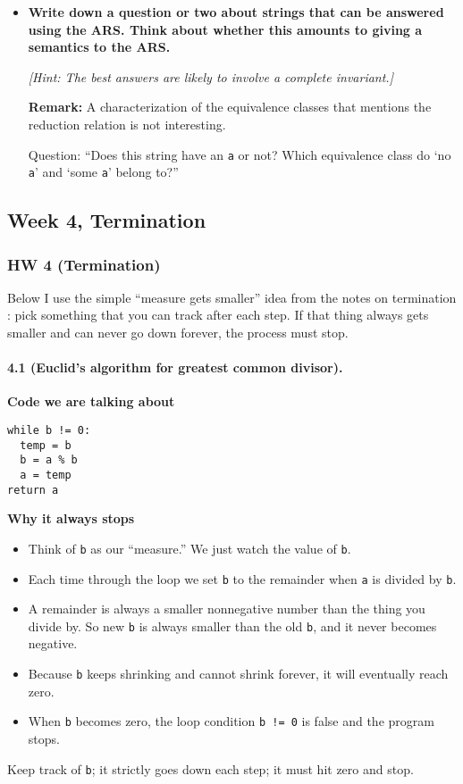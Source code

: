 \documentclass{article}
\theoremstyle{theorem}
\theoremstyle{definition}
\theoremstyle{remark}
\begin{document}
\begin{itemize}
  \item \textbf{Write down a question or two about strings that can be answered using the ARS. Think about whether this amounts to giving a semantics to the ARS.}

  \textit{[Hint: The best answers are likely to involve a complete invariant.]}

  \textbf{Remark:} A characterization of the equivalence classes that mentions the reduction relation is not interesting.

  Question: “Does this string have an \texttt{a} or not? Which equivalence class do ‘no \texttt{a}’ and ‘some \texttt{a}’ belong to?”
\end{itemize}




\subsection{Week 4, Termination}
\subsubsection*{HW 4 (Termination) \cite{kurz-hw4}}
Below I use the simple ``measure gets smaller'' idea from the notes on termination \cite{kurz-termination}: pick something that you can track after each step. If that thing always gets smaller and can never go down forever, the process must stop.

\paragraph{4.1 (Euclid's algorithm for greatest common divisor).}
\textbf{Code we are talking about}
\begin{verbatim}
while b != 0:
  temp = b
  b = a % b
  a = temp
return a
\end{verbatim}

\textbf{Why it always stops}
\begin{itemize}
  \item Think of \texttt{b} as our ``measure.'' We just watch the value of \texttt{b}.
  \item Each time through the loop we set \texttt{b} to the remainder when \texttt{a} is divided by \texttt{b}.
  \item A remainder is always a smaller nonnegative number than the thing you divide by. So new \texttt{b} is always smaller than the old \texttt{b}, and it never becomes negative.
  \item Because \texttt{b} keeps shrinking and cannot shrink forever, it will eventually reach zero.
  \item When \texttt{b} becomes zero, the loop condition \texttt{b != 0} is false and the program stops.
\end{itemize}
Keep track of \texttt{b}; it strictly goes down each step; it must hit zero and stop.
\end{document}
